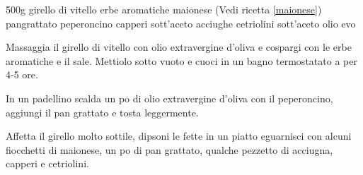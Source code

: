 \begin{ingreds}
	500g girello di vitello 
	erbe aromatiche
	maionese (Vedi ricetta \ref{maionese})
	pangrattato 
	peperoncino 
	capperi  sott'aceto
	acciughe 
	cetriolini sott'aceto 
	olio evo 
\end{ingreds}

\begin{method}
Massaggia il girello di vitello con olio extravergine d'oliva e cospargi con le erbe aromatiche e il sale. Mettiolo sotto vuoto e cuoci in un bagno termostatato a  per 4-5 ore.

In un padellino scalda un po di olio extravergine d'oliva con il peperoncino, aggiungi il pan grattato e tosta leggermente.

Affetta il girello molto sottile, dipsoni le fette in un piatto eguarnisci con alcuni fiocchetti di maionese, un po di pan grattato, qualche pezzetto di acciugna, capperi e cetriolini.
\end {method}
